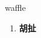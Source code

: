
\begin{frame}
{\huge waffle}
\begin{center}
\begin{enumerate}\Large
  \item \textbf{胡扯}
\end{enumerate}
\end{center}
\end{frame}
